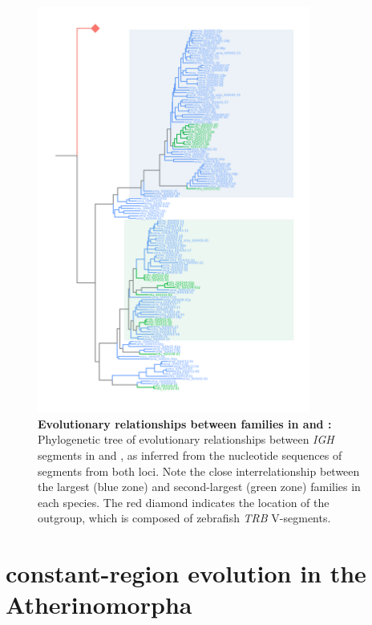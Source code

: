 	\begin{figure}
	\centering
	\includegraphics[width=0.8\textwidth]{_Figures/png/nfu-xma-vh-tree-nt.png}
	\caption[Evolutionary relationships between \vh families in \Xma and \Nfu]{\textbf{Evolutionary relationships between \vh families in \Xma and \Nfu:} Phylogenetic tree of evolutionary relationships between \textit{IGH} \vh segments in \Nfu and \Xma, as inferred from the nucleotide sequences of \vh segments from both loci. Note the close interrelationship between the largest (blue zone) and second-largest (green zone) families in each species. The red diamond indicates the location of the outgroup, which is composed of zebrafish \textit{TRB} V-segments.}
	\label{fig:nfu-xma-vh-tree-nt}
	\end{figure}
		
\FloatBarrier

\clearpage


\section{\igh{} constant-region evolution in the Atherinomorpha}
\label{sec:locus_comparative}

